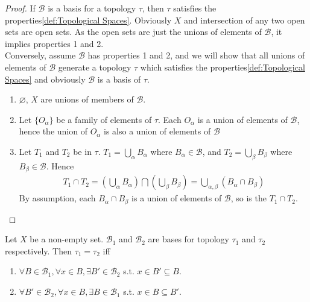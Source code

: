 \begin{proof}
    If $\mathcal{B}$ is a basis for a topology $\tau$, then $\tau$
    satisfies the properties\ref{def:Topological Spaces}. Obviously
    $X$ and intersection of any two open sets are open sets. As the
    open sets are just the unions of elements of $\mathcal{B}$, it
    implies properties 1 and 2.\\
    Conversely, assume $\mathcal{B}$ has properties 1 and 2, and we will
    show that all unions of elements of $\mathcal{B}$ generate a
    topology $\tau$ which satisfies the
    properties\ref{def:Topological Spaces} and obviously
    $\mathcal{B}$ is a basis of $\tau$.
    \begin{enumerate}

        \item $\varnothing$, $X$ are unions of members of $\mathcal{B}$.
        \item Let $\{O_{\alpha}\}$ be a family of elements of $\tau$. Each
            $O_{\alpha}$ is a union of elements of $\mathcal{B}$, hence
            the union of $O_{\alpha}$ is also a union of elements of
            $\mathcal{B}$
        \item Let $T_{1}$ and $T_{2}$ be in $\tau$. $T_{1} =
            \bigcup_{\alpha} B_{\alpha}$ where
            $B_{\alpha} \in \mathcal{B}$, and $T_{2} =
            \bigcup_{\beta} B_{\beta}$ where
            $B_{\beta} \in \mathcal{B}$. Hence
            \begin{align*}
                T_{1} \cap T_{2} = \left(\bigcup_{\alpha}
                B_{\alpha}\right) \bigcap \left(\bigcup_{\beta}
                B_{\beta}\right) = \bigcup_{\alpha, \beta} \left(B_{\alpha}
                \cap B_{\beta}\right)
            \end{align*}
            By assumption, each $B_{\alpha} \cap B_{\beta}$ is a
            union of elements of $\mathcal{B}$, so is the $T_{1} \cap T_{2}$.
    \end{enumerate}

\end{proof}

\begin{theorem}{}{}
    Let $X$ be a non-empty set. $\mathcal{B}_{1}$ and
    $\mathcal{B}_{2}$ are bases for topology $\tau_{1}$ and
    $\tau_{2}$ respectively. Then $\tau_{1} = \tau_{2}$ iff
    \begin{enumerate}

        \item $\forall B \in \mathcal{B}_{1}, \forall x \in B,
            \exists B' \in \mathcal{B}_{2}$ s.t. $x \in B' \subseteq B$.
        \item $\forall  B'\in \mathcal{B}_{2}, \forall x \in B,
            \exists B \in \mathcal{B}_{1}$ s.t. $x \in B \subseteq B'$.

    \end{enumerate}
\end{theorem}

